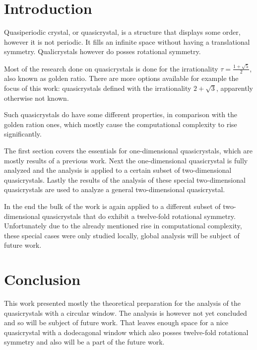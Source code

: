\documentclass[a4paper,10pt,twoside]{article}
\theoremstyle{definition}
\theoremstyle{remark}
\begin{document}
\section*{Introduction}
Quasiperiodic crystal, or quasicrystal, is a structure that displays some order, however it is not periodic. It fills an infinite space without having a translational symmetry. Qualicrystals however do posses rotational symmetry. 

Most of the research done on quasicrystals is done for the irrationality $\tau = \frac{1+\sqrt{5}}{2}$, also known as golden ratio. There are more options available for example the focus of this work: quasicrystals defined with the irrationality $2+\sqrt{3}$, apparently otherwise not known.

Such quasicrystals do have some different properties, in comparison with the golden ration ones, which mostly cause the computational complexity to rise significantly. 

The first section covers the essentials for one-dimensional quasicrystals, which are mostly results of a previous work. Next the one-dimensional quasicrystal is fully analyzed and the analysis is applied to a certain subset of two-dimensional quasicrystals. Lastly the results of the analysis of these special two-dimensional quasicrystals are used to analyze a general two-dimensional quasicrystal. 

In the end the bulk of the work is again applied to a different subset of two-dimensional quasicrystals that do exhibit a twelve-fold rotational symmetry. Unfortunately due to the already mentioned rise in computational complexity, these special cases were only studied locally, global analysis will be subject of future work. 
\cleardoublepage
\pagestyle{plain}

\clearpage

\clearpage

\clearpage

\clearpage

\clearpage

\cleardoublepage

\clearpage

\clearpage

\clearpage

\clearpage


\clearpage
\pagestyle{empty}
\section*{Conclusion}
This work presented mostly the theoretical preparation for the analysis of the quasicrystals with a circular window. The analysis is however not yet concluded and so will be subject of future work. That leaves enough space for a nice quasicrystal with a dodecagonal window which also posses twelve-fold rotational symmetry and also will be a part of the future work. 
\end{document}
